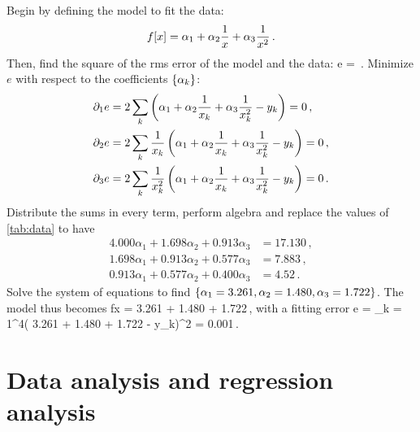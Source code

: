 Begin by defining the model to fit the data:
%
\begin{equation}\label{eq:fittingequation}
    f\!\left[x\right] = \alpha_1 + \alpha_2 \dfrac{1}{x} + \alpha_3 \dfrac{1}{x^2}\,.
\end{equation}
%
Then, find the square of the rms error of the model and the data:
%
\beq
    e = \,.    
\eeq
%
Minimize $e$ with respect to the coefficients $\left\lbrace{\alpha_k}\right\rbrace$:
%
\begin{align*}
%
\ipd 1e &= 2\ssum{k}{\left(\alpha_1 + \alpha_2\dfrac{1}{x_k} + \alpha_3\dfrac{1}{x_k^2} - y_k\right)} = 0\,,\\
%
\ipd 2e &= 2\ssum{k}{\dfrac{1}{x_k}\left(\alpha_1 + \alpha_2\dfrac{1}{x_k} + \alpha_3\dfrac{1}{x_k^2} - y_k\right)} = 0\,,\\
%
\ipd 3e &= 2\ssum{k}{\dfrac{1}{x^2_k}\left(\alpha_1 + \alpha_2\dfrac{1}{x_k} + \alpha_3\dfrac{1}{x_k^2} - y_k\right)} = 0\,.
%
\end{align*}
%
Distribute the sums in every term, perform algebra and replace the values of \cref{tab:data} to have
%
\begin{align*}
    4.000\alpha_1 + 1.698\alpha_2 + 0.913\alpha_3 &= 17.130\,,\\
    1.698\alpha_1 + 0.913\alpha_2 + 0.577\alpha_3 &= 7.883\,,\\
    0.913\alpha_1 + 0.577\alpha_2 + 0.400\alpha_3 &= 4.52\,.
\end{align*}
%
Solve the system of equations to find $\left\lbrace{\alpha_1 = 3.261, \alpha_2 = 1.480, \alpha_3 = 1.722}\right\rbrace$. The model thus becomes
%
\beq
    f\vat x = 3.261 + 1.480 + 1.722\,,
\eeq
%
with a fitting error
%
\beq
    e = \sum_{k = 1}^4\left( 3.261 + 1.480 + 1.722 - y_k\right)^2 
      = 0.001\,. \mqed
\eeq


\section*{Data analysis and regression analysis}



